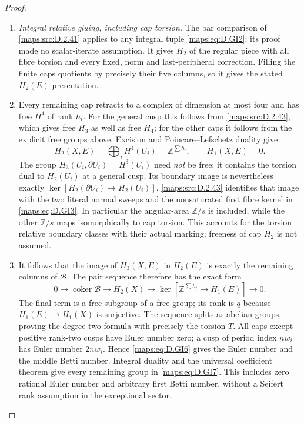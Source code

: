 \begin{proof}
\begin{enumerate}[label=\arabic*.,leftmargin=*]
\item \emph{Integral relative gluing, including cap torsion.}
The bar comparison of \ref{maps:src:D.2.41} applies to any integral
tuple \eqref{maps:eq:D.GI2}; its proof made no scalar-iterate
assumption. It gives $H_2$ of the regular piece
with all fibre torsion and every fixed, norm and
last-peripheral correction. Filling the finite
caps quotients by precisely their five columns,
so it gives the stated $H_2(E)$ presentation.

\item Every remaining cap retracts to a complex of
dimension at most four and has free $H^4$ of
rank $h_i$. For the general cusp this follows
from \ref{maps:src:D.2.43}, which gives free $H_3$ as well as
free $H_4$; for the other caps it follows from
the explicit free groups above. Excision and
Poincare--Lefschetz duality give
\[
 H_2(X,E)=\bigoplus_iH^4(U_i)=\mathbb Z^{\sum h_i},
                    \qquad H_1(X,E)=0 .                  \tag{D.GI10}\label{maps:eq:D.GI10}
\]
The group $H_3(U_i,\partial U_i)=H^3(U_i)$ need
\emph{not} be free: it contains the torsion dual
to $H_2(U_i)$ at a general cusp. Its boundary
image is nevertheless exactly
$\ker[H_2(\partial U_i)\to H_2(U_i)]$.
\ref{maps:src:D.2.43} identifies that image with the two literal
normal sweeps and the nonsaturated first fibre
kernel in \eqref{maps:eq:D.GI3}. In particular the angular-area
$\mathbb Z/s$ is included, while the other
$\mathbb Z/s$ maps isomorphically to cap torsion.
This accounts for the torsion relative boundary
classes with their actual marking; freeness of
cap $H_2$ is not assumed.

\item It follows that the image of $H_3(X,E)$ in
$H_2(E)$ is exactly the remaining columns of
$\mathcal B$. The pair sequence therefore has
the exact form
\[
 0\longrightarrow\operatorname{coker}\mathcal B
 \longrightarrow H_2(X)
 \longrightarrow\ker[\mathbb Z^{\sum h_i}\to H_1(E)]
 \longrightarrow0.                                      \tag{D.GI11}\label{maps:eq:D.GI11}
\]
The final term is a free subgroup of a free
group; its rank is $q$ because
$H_1(E)\to H_1(X)$ is surjective. The sequence
splits as abelian groups, proving the degree-two
formula with precisely the torsion $T$.
All caps except positive rank-two cusps have
Euler number zero; a cusp of period index $nw_i$
has Euler number $2nw_i$. Hence \eqref{maps:eq:D.GI6} gives
the Euler number and the middle Betti number.
Integral duality and the universal coefficient
theorem give every remaining group in \eqref{maps:eq:D.GI7}.
This includes zero rational Euler number and
arbitrary first Betti number, without a Seifert
rank assumption in the exceptional sector.
\end{enumerate}
\end{proof}

